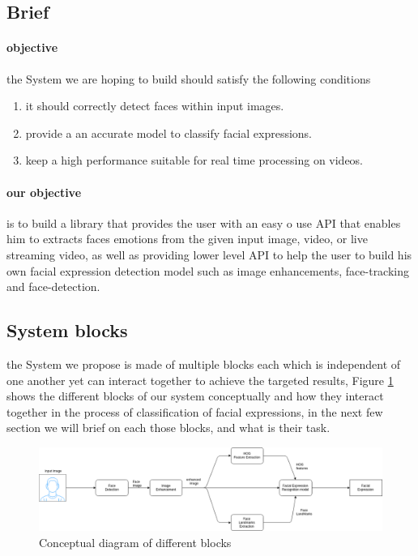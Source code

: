 \subsection{Brief}
\paragraph{objective}
the System we are hoping to build should satisfy the following conditions
\begin{enumerate}
	\item it should correctly detect faces within input images.
	\item provide a an accurate model to classify facial expressions.
	\item keep a high performance suitable for real time processing on videos.
\end{enumerate}
\paragraph{our objective} is to build a library that provides the user with an easy o use API that enables him to extracts faces emotions from the given input image, video, or live streaming video, as well as providing lower level API to help the user to build his own facial expression detection model such as image enhancements, face-tracking and face-detection.
\subsection{System blocks}
the System we propose is made of multiple blocks each which is independent of one another yet can interact together to achieve the targeted results, Figure 
\ref{fig:facial_expression_detection} shows the different blocks of our system conceptually and how they interact together in the process of classification of facial expressions, in the next few section we will brief on each those blocks, and what is their task. 

\begin{figure}
	\centering
	\includegraphics[width=\textwidth]{images/facial_expression_detection.png}
	\caption{Conceptual diagram of different blocks}
	\label{fig:facial_expression_detection}
\end{figure}

